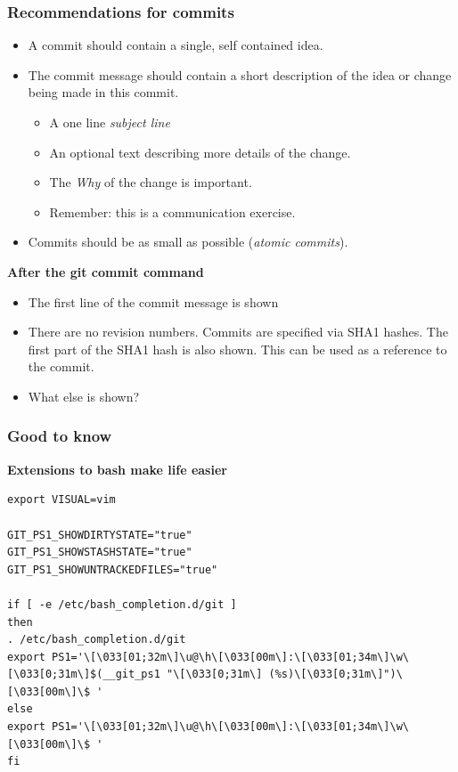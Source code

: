 \documentclass{gittalk}
\begin{document}
\begin{frame}
\frametitle{Recommendations for commits}
\begin{itemize}
  \item A commit should contain a single, self contained idea.
  \item The commit message should contain a short description of the
    idea or change being made in this commit.
    \begin{itemize}
	  \item A one line \emph{subject line}
	  \item An optional text describing more details of the change.
	  \item The \emph{Why} of the change is important.
	  \item Remember: this is a communication exercise.
    \end{itemize}
  \item Commits should be as small as possible (\emph{atomic
    commits}).
\end{itemize}
\pause
\vspace*{0.5em}
\textbf{After the git commit command}
\begin{itemize}
  \item The first line of the commit message is shown
  \item There are no revision numbers. Commits are
        specified via SHA1 hashes. The first part of the SHA1 hash is also
        shown. This can be used as a reference to the commit.
  \item What else is shown?
\end{itemize}
\end{frame}

\begin{frame}[fragile]
\frametitle{Good to know}
\textbf{Extensions to bash make life easier}
\vspace*{0.5em}
\begin{lstlisting}[basicstyle=\tiny\ttfamily]
export VISUAL=vim

GIT_PS1_SHOWDIRTYSTATE="true"
GIT_PS1_SHOWSTASHSTATE="true"
GIT_PS1_SHOWUNTRACKEDFILES="true"

if [ -e /etc/bash_completion.d/git ]
then
. /etc/bash_completion.d/git
export PS1='\[\033[01;32m\]\u@\h\[\033[00m\]:\[\033[01;34m\]\w\[\033[0;31m\]$(__git_ps1 "\[\033[0;31m\] (%s)\[\033[0;31m\]")\[\033[00m\]\$ '
else
export PS1='\[\033[01;32m\]\u@\h\[\033[00m\]:\[\033[01;34m\]\w\[\033[00m\]\$ '
fi
\end{lstlisting}
\end{frame}
\end{document}
